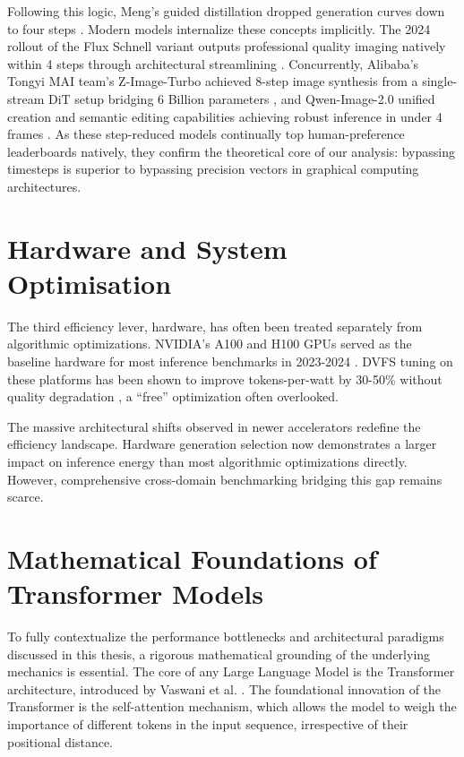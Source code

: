 \documentclass[12pt, a4paper]{report}
\begin{document}
Following this logic, Meng's guided distillation dropped generation curves down to four steps \cite{meng2023distillation}. Modern models internalize these concepts implicitly. The 2024 rollout of the Flux Schnell variant outputs professional quality imaging natively within 4 steps through architectural streamlining \cite{bfl2024flux}. Concurrently, Alibaba’s Tongyi MAI team's Z-Image-Turbo achieved 8-step image synthesis from a single-stream DiT setup bridging 6 Billion parameters \cite{tongyi2025zimage}, and Qwen-Image-2.0 unified creation and semantic editing capabilities achieving robust inference in under 4 frames \cite{wu2025qwenimage}. As these step-reduced models continually top human-preference leaderboards natively, they confirm the theoretical core of our analysis: bypassing timesteps is superior to bypassing precision vectors in graphical computing architectures.

\section{Hardware and System Optimisation}
The third efficiency lever, hardware, has often been treated separately from algorithmic optimizations. NVIDIA's A100 and H100 GPUs served as the baseline hardware for most inference benchmarks in 2023-2024 \cite{nvidia2023a100, nvidia2024h100}. DVFS tuning on these platforms has been shown to improve tokens-per-watt by 30-50\% without quality degradation \cite{mei2017dvfs, maliakel2025dvfs}, a ``free'' optimization often overlooked.

The massive architectural shifts observed in newer accelerators redefine the efficiency landscape. Hardware generation selection now demonstrates a larger impact on inference energy than most algorithmic optimizations directly. However, comprehensive cross-domain benchmarking bridging this gap remains scarce.

\section{Mathematical Foundations of Transformer Models}
To fully contextualize the performance bottlenecks and architectural paradigms discussed in this thesis, a rigorous mathematical grounding of the underlying mechanics is essential. The core of any Large Language Model is the Transformer architecture, introduced by Vaswani et al. \cite{liu2024survey}. The foundational innovation of the Transformer is the self-attention mechanism, which allows the model to weigh the importance of different tokens in the input sequence, irrespective of their positional distance. 
\end{document}
